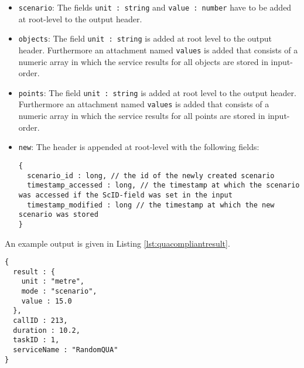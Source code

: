 \begin{itemize}
  \item \texttt{scenario}: The fields \texttt{unit : string} and \texttt{value : number} have to be added at root-level to the output header.

  \item \texttt{objects}: The field \texttt{unit : string} is added at root level to the output header. Furthermore an attachment named \texttt{values} is added that consists of a numeric array in which the service results for all objects are stored in input-order.

  \item \texttt{points}: The field \texttt{unit : string} is added at root level to the output header. Furthermore an attachment named \texttt{values} is added that consists of a numeric array in which the service results for all points are stored in input-order.

  \item \texttt{new}: The header is appended at root-level with the following fields:
  \begin{lstlisting}
{
  scenario_id : long, // the id of the newly created scenario
  timestamp_accessed : long, // the timestamp at which the scenario was accessed if the ScID-field was set in the input
  timestamp_modified : long // the timestamp at which the new scenario was stored
}
  \end{lstlisting}
\end{itemize}

An example output is given in Listing \ref{lst:quacompliantresult}.

\begin{lstlisting}[caption={A qua-compliant service output}, label={lst:quacompliantresult}]
{
  result : {
    unit : "metre",
    mode : "scenario",
    value : 15.0
  },
  callID : 213,
  duration : 10.2,
  taskID : 1,
  serviceName : "RandomQUA"
}
\end{lstlisting}

\clearpage
